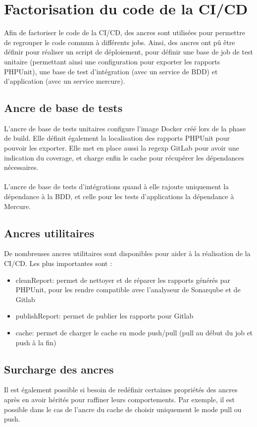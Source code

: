 \documentclass{article}
\begin{document}
    \section{Factorisation du code de la CI/CD}

        Afin de factoriser le code de la CI/CD, des ancres sont utilisées pour permettre de regrouper le code commun à différents jobs. Ainsi, des ancres ont pû être définir pour réaliser un script de déploiement, pour définir une base de job de test unitaire (permettant ainsi une configuration pour exporter les rapports PHPUnit), une base de test d'intégration (avec un service de BDD) et d'application (avec un service mercure).
        
        \subsection{Ancre de base de tests}

            L'ancre de base de tests unitaires configure l'image Docker créé lors de la phase de build. Elle définit également la localisation des rapports PHPUnit pour pouvoir les exporter. Elle met en place aussi la regexp GitLab pour avoir une indication du coverage, et charge enfin le cache pour récupérer les dépendances nécessaires.\\
            \\
            \indent L'ancre de base de tests d'intégrations quand à elle rajoute uniquement la dépendance à la BDD, et celle pour les tests d'applications la dépendance à Mercure.

        \subsection{Ancres utilitaires}

            De nombreuses ancres utilitaires sont disponibles pour aider à la réalisation de la CI/CD. Les plus importantes sont :
            \begin{itemize}
                \item cleanReport: permet de nettoyer et de réparer les rapports générés par PHPUnit, pour les rendre compatible avec l'analyseur de Sonarqube et de Gitlab
                \item publishReport: permet de publier les rapports pour Gitlab
                \item cache: permet de charger le cache en mode push/pull (pull au début du job et push à la fin)
            \end{itemize}

        \subsection{Surcharge des ancres}

            Il est également possible si besoin de redéfinir certaines propriétés des ancres après en avoir hérités pour raffiner leurs comportements. Par exemple, il est possible dans le cas de l'ancre du cache de choisir uniquement le mode pull ou push.
\end{document}
